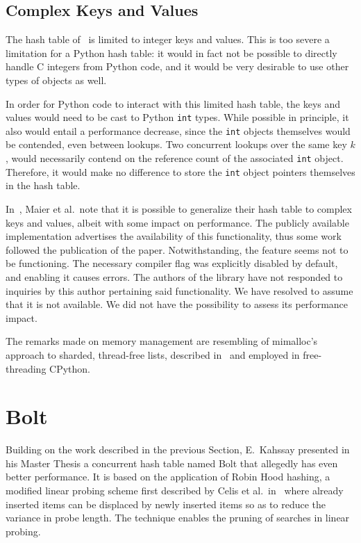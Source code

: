 \subsection{Complex Keys and Values}\label{subsec:maier-complex-keys-and-values}

The hash table of~\cite{maier} is limited to integer keys and values.
This is too severe a limitation for a Python hash table: it would in fact not be possible to directly handle C integers from Python code, and it would be very desirable to use other types of objects as well.

In order for Python code to interact with this limited hash table, the keys and values would need to be cast to Python \texttt{int} types.
While possible in principle, it also would entail a performance decrease, since the \texttt{int} objects themselves would be contended, even between lookups.
Two concurrent lookups over the same key $k$, would necessarily contend on the reference count of the associated \texttt{int} object.
Therefore, it would make no difference to store the \texttt{int} object pointers themselves in the hash table.

In~\cite[\S5.7]{maier}, Maier et al.\ note that it is possible to generalize their hash table to complex keys and values, albeit with some impact on performance.
The publicly available implementation advertises the availability of this functionality, thus some work followed the publication of the paper.
Notwithstanding, the feature seems not to be functioning.
The necessary compiler flag was explicitly disabled by default, and enabling it causes errors.
The authors of the library have not responded to inquiries by this author pertaining said functionality.
We have resolved to assume that it is not available.
We did not have the possibility to assess its performance impact.

The remarks made on memory management are resembling of mimalloc's approach to sharded, thread-free lists, described in~\cite{mimalloc} and employed in free-threading CPython.


\section{Bolt}\label{sec:bolt}

Building on the work described in the previous Section, E.\ Kahssay presented in his Master Thesis a concurrent hash table named Bolt that allegedly has even better performance.
It is based on the application of Robin Hood hashing, a modified linear probing scheme first described by Celis et al.\ in~\cite{robin-hood} where already inserted items can be displaced by newly inserted items so as to reduce the variance in probe length.
The technique enables the pruning of searches in linear probing.

